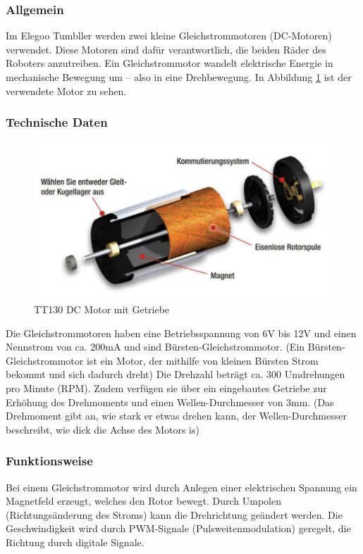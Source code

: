 \subsubsection{Allgemein}
Im Elegoo Tumbller werden zwei kleine Gleichstrommotoren (DC-Motoren) verwendet. Diese Motoren sind dafür verantwortlich, die beiden Räder des Roboters anzutreiben. Ein Gleichstrommotor wandelt elektrische Energie in mechanische Bewegung um – also in eine Drehbewegung. In Abbildung \ref{fig:gleichstrommotor} ist der verwendete Motor zu sehen.

\subsubsection{Technische Daten}
\begin{figure}[H]
    \centering
    \includegraphics[width=1\textwidth]{img/Hardware/gleichstrommotor.png}
    \caption{TT130 DC Motor mit Getriebe}
    \label{fig:gleichstrommotor}
\end{figure}
Die Gleichstrommotoren haben eine Betriebsspannung von 6V bis 12V und einen Nennstrom von ca. 200mA und sind Bürsten-Gleichstrommotor. 
(Ein Bürsten-Gleichstrommotor ist ein Motor, der mithilfe von kleinen Bürsten Strom bekommt und sich dadurch dreht) Die Drehzahl beträgt ca. 300 Umdrehungen pro Minute (RPM). 
Zudem verfügen sie über ein eingebautes Getriebe zur Erhöhung des Drehmoments und einen Wellen-Durchmesser von 3mm. 
(Das Drehmoment gibt an, wie stark er etwas drehen kann, der Wellen-Durchmesser beschreibt, wie dick die Achse des Motors is)
\subsubsection{Funktionsweise}
Bei einem Gleichstrommotor wird durch Anlegen einer elektrischen Spannung ein Magnetfeld erzeugt, welches den Rotor bewegt. 
Durch Umpolen (Richtungsänderung des Stroms) kann die Drehrichtung geändert werden. 
Die Geschwindigkeit wird durch PWM-Signale (Pulsweitenmodulation) geregelt, die Richtung durch digitale Signale.

